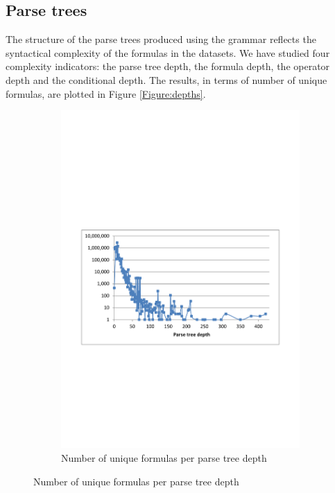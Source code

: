\documentclass[times]{smrauth}
\begin{document}
\subsection{Parse trees}

The structure of the parse trees produced using the grammar reflects the syntactical complexity of the formulas in the datasets. We have studied four complexity indicators: the parse tree depth, the formula depth, the operator depth and the conditional depth. The results, in terms of number of unique formulas, are plotted in Figure \ref{Figure:depths}.

\begin{figure}
	\centering
	\begin{subfigure}[b]{0.49\textwidth}
		\centering
		\includegraphics[width=1\textwidth]{img/depths1}
		\caption{Number of unique formulas per parse tree depth}
		\label{fig:depthTree}

\end{subfigure}
\end{figure}
\end{document}
